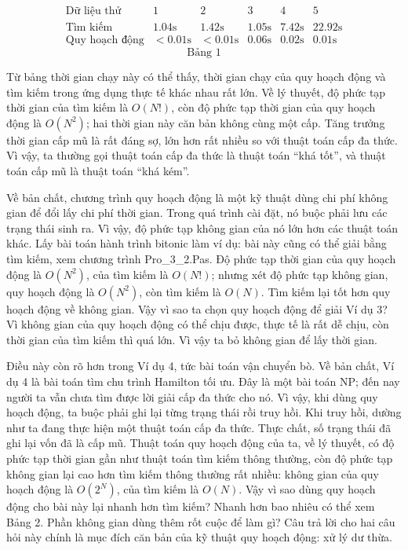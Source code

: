 \documentclass[11pt]{article}
\begin{document}
\[
\begin{array}{c|ccccc}
\text{Dữ liệu thử} & 1 & 2 & 3 & 4 & 5\\ \hline
\text{Tìm kiếm} & 1.04\text{s} & 1.42\text{s} & 1.05\text{s} &
7.42\text{s} & 22.92\text{s}\\
\text{Quy hoạch động} & <0.01\text{s} & <0.01\text{s} & 0.06\text{s} &
0.02\text{s} & 0.01\text{s}
\end{array}
\]
\[
\text{Bảng 1}
\]

Từ bảng thời gian chạy này có thể thấy, thời gian chạy của quy hoạch động và
tìm kiếm trong ứng dụng thực tế khác nhau rất lớn. Về lý thuyết, độ phức tạp
thời gian của tìm kiếm là \(O(N!)\), còn độ phức tạp thời gian của quy hoạch
động là \(O(N^2)\); hai thời gian này căn bản không cùng một cấp. Tăng trưởng
thời gian cấp mũ là rất đáng sợ, lớn hơn rất nhiều so với thuật toán cấp đa
thức. Vì vậy, ta thường gọi thuật toán cấp đa thức là thuật toán ``khá tốt'',
và thuật toán cấp mũ là thuật toán ``khá kém''.

Về bản chất, chương trình quy hoạch động là một kỹ thuật dùng chi phí không
gian để đổi lấy chi phí thời gian. Trong quá trình cài đặt, nó buộc phải lưu
các trạng thái sinh ra. Vì vậy, độ phức tạp không gian của nó lớn hơn các
thuật toán khác. Lấy bài toán hành trình bitonic làm ví dụ: bài này cũng có
thể giải bằng tìm kiếm, xem chương trình Pro\_3\_2.Pas. Độ phức tạp thời gian
của quy hoạch động là \(O(N^2)\), của tìm kiếm là \(O(N!)\); nhưng xét độ
phức tạp không gian, quy hoạch động là \(O(N^2)\), còn tìm kiếm là \(O(N)\).
Tìm kiếm lại tốt hơn quy hoạch động về không gian. Vậy vì sao ta chọn quy
hoạch động để giải Ví dụ 3? Vì không gian của quy hoạch động có thể chịu
được, thực tế là rất dễ chịu, còn thời gian của tìm kiếm thì quá lớn. Vì vậy
ta bỏ không gian để lấy thời gian.

Điều này còn rõ hơn trong Ví dụ 4, tức bài toán vận chuyển bò. Về bản chất,
Ví dụ 4 là bài toán tìm chu trình Hamilton tối ưu. Đây là một bài toán NP; đến
nay người ta vẫn chưa tìm được lời giải cấp đa thức cho nó. Vì vậy, khi dùng
quy hoạch động, ta buộc phải ghi lại từng trạng thái rồi truy hồi. Khi truy
hồi, dường như ta đang thực hiện một thuật toán cấp đa thức. Thực chất, số
trạng thái đã ghi lại vốn đã là cấp mũ. Thuật toán quy hoạch động của ta, về
lý thuyết, có độ phức tạp thời gian gần như thuật toán tìm kiếm thông thường,
còn độ phức tạp không gian lại cao hơn tìm kiếm thông thường rất nhiều: không
gian của quy hoạch động là \(O(2^N)\), của tìm kiếm là \(O(N)\). Vậy vì sao
dùng quy hoạch động cho bài này lại nhanh hơn tìm kiếm? Nhanh hơn bao nhiêu
có thể xem Bảng 2. Phần không gian dùng thêm rốt cuộc để làm gì? Câu trả lời
cho hai câu hỏi này chính là mục đích căn bản của kỹ thuật quy hoạch động:
xử lý dư thừa.
\end{document}
